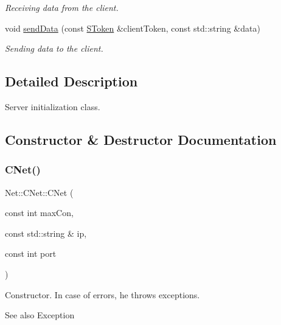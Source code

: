 \begin{DoxyCompactItemize}
\begin{DoxyCompactList}\small\item\em Receiving data from the client. \end{DoxyCompactList}\item 
void \mbox{\hyperlink{class_net_1_1_c_net_a22a961e8db355efd94539336937b956b}{send\+Data}} (const \mbox{\hyperlink{struct_net_1_1_s_token}{S\+Token}} \&client\+Token, const std\+::string \&data)
\begin{DoxyCompactList}\small\item\em Sending data to the client. \end{DoxyCompactList}\end{DoxyCompactItemize}


\subsection{Detailed Description}
Server initialization class. 

\subsection{Constructor \& Destructor Documentation}
\mbox{\label{class_net_1_1_c_net_a2e7bdcc29f062828ecac6f2caa1bbf5c}} 
\subsubsection{\texorpdfstring{C\+Net()}{CNet()}}
{\footnotesize\ttfamily Net\+::\+C\+Net\+::\+C\+Net (\begin{DoxyParamCaption}\item[{const int}]{max\+Con,  }\item[{const std\+::string \&}]{ip,  }\item[{const int}]{port }\end{DoxyParamCaption})}



Constructor. In case of errors, he throws exceptions. 

\begin{DoxySeeAlso}{See also}
Exception
\end{DoxySeeAlso}

